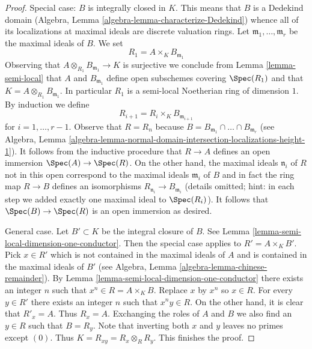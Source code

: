 \begin{proof}
Special case: $B$ is integrally closed in $K$. This means that
$B$ is a Dedekind domain
(Algebra, Lemma \ref{algebra-lemma-characterize-Dedekind})
whence all of its localizations at maximal ideals are discrete valuation rings.
Let $\mathfrak m_1, \ldots, \mathfrak m_r$ be the maximal ideals of
$B$. We set
$$
R_1 = A \times_K B_{\mathfrak m_1}
$$
Observing that $A \otimes_{R_1} B_{\mathfrak m_1} \to K$ is surjective
we conclude from Lemma \ref{lemma-semi-local} that $A$ and
$B_{\mathfrak m_1}$ define open subschemes covering $\Spec(R_1)$ and that
$K = A \otimes_{R_1} B_{\mathfrak m_1}$. In particular $R_1$ is a
semi-local Noetherian ring of dimension $1$. By induction we define
$$
R_{i + 1} = R_i \times_K B_{\mathfrak m_{i + 1}}
$$
for $i = 1, \ldots, r - 1$. Observe that $R = R_n$ because
$B = B_{\mathfrak m_1} \cap \ldots \cap B_{\mathfrak m_r}$ (see
Algebra, Lemma
\ref{algebra-lemma-normal-domain-intersection-localizations-height-1}).
It follows from the inductive procedure that $R \to A$ defines an
open immersion $\Spec(A) \to \Spec(R)$. On the other hand, the
maximal ideals $\mathfrak n_i$ of $R$ not in this open correspond
to the maximal ideals $\mathfrak m_i$ of $B$ and in fact
the ring map $R \to B$ defines an isomorphisms
$R_{\mathfrak n_i} \to B_{\mathfrak m_i}$ (details omitted; hint:
in each step we added exactly one maximal ideal to $\Spec(R_i)$).
It follows that $\Spec(B) \to \Spec(R)$ is an open immersion
as desired.

\medskip\noindent
General case. Let $B' \subset K$ be the integral closure of $B$.
See Lemma \ref{lemma-semi-local-dimension-one-conductor}.
Then the special case applies to $R' = A \times_K B'$.
Pick $x \in R'$ which is not contained in the maximal
ideals of $A$ and is contained in the maximal ideals of $B'$
(see Algebra, Lemma \ref{algebra-lemma-chinese-remainder}).
By Lemma \ref{lemma-semi-local-dimension-one-conductor}
there exists an integer $n$ such that $x^n \in R = A \times_K B$.
Replace $x$ by $x^n$ so $x \in R$. For every $y \in R'$ there exists
an integer $n$ such that $x^n y \in R$. On the other hand,
it is clear that $R'_x = A$. Thus $R_x = A$.
Exchanging the roles of $A$ and $B$ we also find an $y \in R$
such that $B = R_y$. Note that inverting both $x$ and $y$
leaves no primes except $(0)$. Thus $K = R_{xy} = R_x \otimes_R R_y$.
This finishes the proof.
\end{proof}

